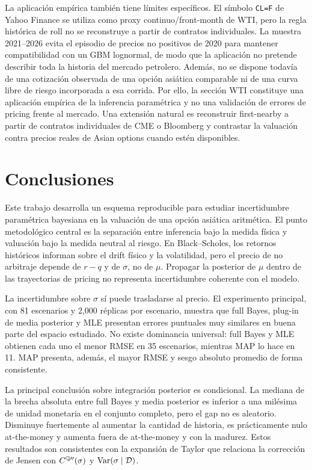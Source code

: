 La aplicación empírica también tiene límites específicos. El símbolo \texttt{CL=F} de Yahoo Finance se utiliza como proxy continuo/front-month de WTI, pero la regla histórica de roll no se reconstruye a partir de contratos individuales. La muestra 2021--2026 evita el episodio de precios no positivos de 2020 para mantener compatibilidad con un GBM lognormal, de modo que la aplicación no pretende describir toda la historia del mercado petrolero. Además, no se dispone todavía de una cotización observada de una opción asiática comparable ni de una curva libre de riesgo incorporada a esa corrida. Por ello, la sección WTI constituye una aplicación empírica de la inferencia paramétrica y no una validación de errores de pricing frente al mercado. Una extensión natural es reconstruir first-nearby a partir de contratos individuales de CME o Bloomberg y contrastar la valuación contra precios reales de Asian options cuando estén disponibles.

\section{Conclusiones}

Este trabajo desarrolla un esquema reproducible para estudiar incertidumbre paramétrica bayesiana en la valuación de una opción asiática aritmética. El punto metodológico central es la separación entre inferencia bajo la medida física y valuación bajo la medida neutral al riesgo. En Black--Scholes, los retornos históricos informan sobre el drift físico y la volatilidad, pero el precio de no arbitraje depende de $r-q$ y de $\sigma$, no de $\mu$. Propagar la posterior de $\mu$ dentro de las trayectorias de pricing no representa incertidumbre coherente con el modelo.

La incertidumbre sobre $\sigma$ sí puede trasladarse al precio. El experimento principal, con 81 escenarios y 2,000 réplicas por escenario, muestra que full Bayes, plug-in de media posterior y MLE presentan errores puntuales muy similares en buena parte del espacio estudiado. No existe dominancia universal: full Bayes y MLE obtienen cada uno el menor RMSE en 35 escenarios, mientras MAP lo hace en 11. MAP presenta, además, el mayor RMSE y sesgo absoluto promedio de forma consistente.

La principal conclusión sobre integración posterior es condicional. La mediana de la brecha absoluta entre full Bayes y media posterior es inferior a una milésima de unidad monetaria en el conjunto completo, pero el gap no es aleatorio. Disminuye fuertemente al aumentar la cantidad de historia, es prácticamente nulo at-the-money y aumenta fuera de at-the-money y con la madurez. Estos resultados son consistentes con la expansión de Taylor que relaciona la corrección de Jensen con $C^{\mathbb{Q}\prime\prime}(\sigma)$ y $\operatorname{Var}(\sigma\mid\mathcal D)$.

